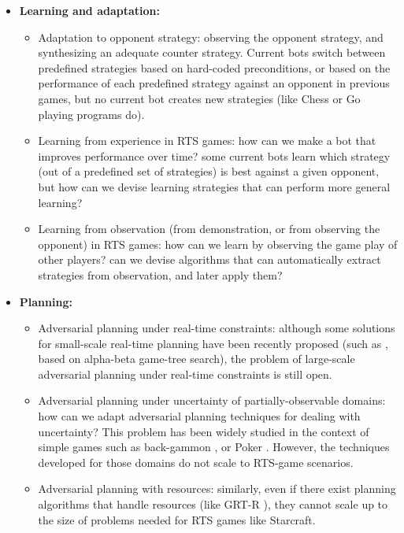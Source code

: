 \documentclass[journal]{IEEEtran}
\begin{document}
\begin{itemize}

\item {\bf Learning and adaptation:}
\begin{itemize}
\item Adaptation to opponent strategy: observing the opponent strategy, and synthesizing an adequate counter strategy. Current bots switch between predefined strategies based on hard-coded preconditions, or based on the performance of each predefined strategy against an opponent in previous games, but no current bot creates new strategies (like Chess or Go playing programs do).
\item Learning from experience in RTS games: how can we make a bot that improves performance over time? some current bots learn which strategy (out of a predefined set of strategies) is best against a given opponent, but how can we devise learning strategies that can perform more general learning?
\item Learning from observation (from demonstration, or from observing the opponent) in RTS games: how can we learn by observing the game play of other players? can we devise algorithms that can automatically extract strategies from observation, and later apply them?
\end{itemize}

\item {\bf Planning:}
\begin{itemize}
\item Adversarial planning under real-time constraints: although some solutions for small-scale real-time planning have been recently proposed (such as \cite{churchill2012AIIDE}, based on alpha-beta game-tree search), the problem of large-scale adversarial planning under real-time constraints is still open.
\item Adversarial planning under uncertainty of partially-observable domains: how can we adapt adversarial planning techniques for dealing with uncertainty? This problem has been widely studied in the context of simple games such as back-gammon \cite{???}, or Poker \cite{???}. However, the techniques developed for those domains do not scale to RTS-game scenarios.
\item Adversarial planning with resources: similarly, even if there exist planning algorithms that handle resources (like GRT-R \cite{???}), they cannot scale up to the size of problems needed for RTS games like Starcraft.
\end{itemize}


\end{itemize}
\end{document}
